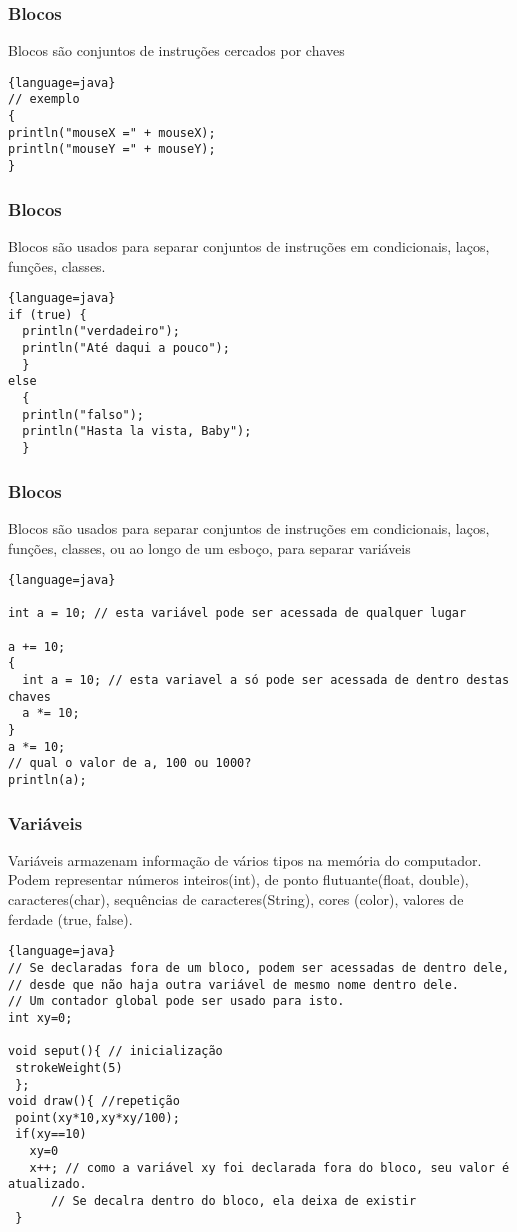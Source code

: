\documentclass{beamer}
\begin{document}
\begin{frame}[fragile]
\frametitle{Blocos}
Blocos são conjuntos de instruções cercados por chaves {}
\begin{lstlisting}{language=java}
// exemplo
{ 
println("mouseX =" + mouseX);
println("mouseY =" + mouseY);
}
\end{lstlisting}
\end{frame}

\begin{frame}[fragile]
\frametitle{Blocos}
Blocos são usados para separar conjuntos de instruções em condicionais, laços, funções, classes. 
\begin{lstlisting}{language=java}
if (true) { 
  println("verdadeiro");
  println("Até daqui a pouco");
  }
else 
  {
  println("falso");
  println("Hasta la vista, Baby");
  }
\end{lstlisting}
\end{frame}


\begin{frame}[fragile]
\frametitle{Blocos}
Blocos são usados para separar conjuntos de instruções em condicionais, laços, funções, classes, ou ao longo de um esboço, para separar variáveis
\begin{lstlisting}{language=java}

int a = 10; // esta variável pode ser acessada de qualquer lugar

a += 10;
{
  int a = 10; // esta variavel a só pode ser acessada de dentro destas chaves
  a *= 10;
}
a *= 10; 
// qual o valor de a, 100 ou 1000?
println(a);

\end{lstlisting}
\end{frame}


\begin{frame}[fragile]
\frametitle{Variáveis}
Variáveis armazenam informação de vários tipos na memória do computador.
Podem representar números inteiros(int), de ponto flutuante(float, double), caracteres(char), sequências de caracteres(String), cores (color), valores de ferdade (true, false).  
\begin{lstlisting}{language=java}
// Se declaradas fora de um bloco, podem ser acessadas de dentro dele, 
// desde que não haja outra variável de mesmo nome dentro dele. 
// Um contador global pode ser usado para isto.
int xy=0;

void seput(){ // inicialização
 strokeWeight(5)
 };
void draw(){ //repetição
 point(xy*10,xy*xy/100);
 if(xy==10)
   xy=0
   x++; // como a variável xy foi declarada fora do bloco, seu valor é atualizado.
      // Se decalra dentro do bloco, ela deixa de existir
 } 
\end{lstlisting}
\end{frame}
\end{document}
